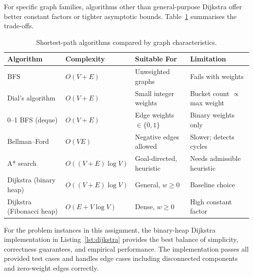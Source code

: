 \documentclass[11pt,a4paper]{article}
\begin{document}
For specific graph families, algorithms other than general-purpose Dijkstra offer better
constant factors or tighter asymptotic bounds. Table~\ref{tab:alternatives} summarises the
trade-offs.

\begin{table}[h]
  \centering
  \caption{Shortest-path algorithms compared by graph characteristics.}
  \label{tab:alternatives}
  \begin{tabular}{@{}llll@{}}
    \toprule
    \textbf{Algorithm} & \textbf{Complexity} & \textbf{Suitable For} & \textbf{Limitation} \\
    \midrule
    BFS                         & $O(V+E)$            & Unweighted graphs       & Fails with weights \\
    Dial's algorithm            & $O(V+E)$            & Small integer weights   & Bucket count $\propto$ max weight \\
    0--1 BFS (deque)            & $O(V+E)$            & Edge weights $\in\{0,1\}$ & Binary weights only \\
    Bellman--Ford               & $O(VE)$             & Negative edges allowed  & Slower; detects cycles \\
    A* search                   & $O((V+E)\log V)$    & Goal-directed, heuristic & Needs admissible heuristic \\
    Dijkstra (binary heap)      & $O((V+E)\log V)$    & General, $w \ge 0$      & Baseline choice \\
    Dijkstra (Fibonacci heap)   & $O(E+V\log V)$      & Dense, $w \ge 0$        & High constant factor \\
    \bottomrule
  \end{tabular}
\end{table}

For the problem instances in this assignment, the binary-heap Dijkstra implementation in
Listing~\ref{lst:dijkstra} provides the best balance of simplicity, correctness guarantees,
and empirical performance. The implementation passes all provided test cases and handles
edge cases including disconnected components and zero-weight edges correctly.
\end{document}
